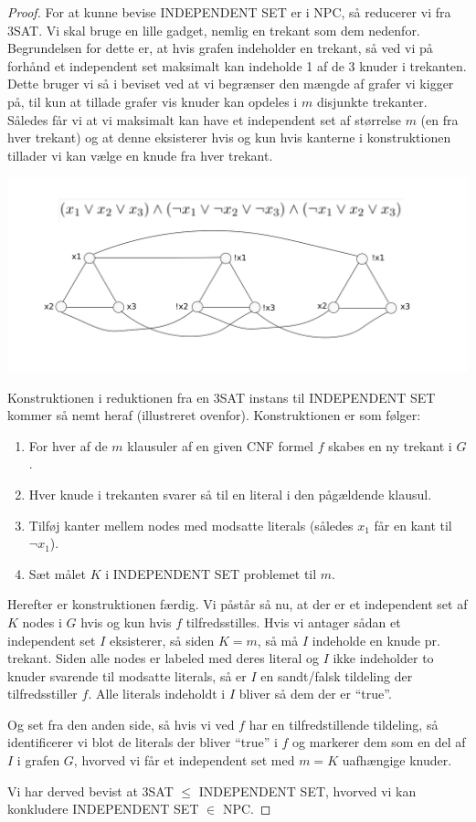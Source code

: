 \begin{proof}
 For at kunne bevise INDEPENDENT SET er i NPC, så reducerer vi fra 3SAT. Vi skal bruge en lille gadget, nemlig en trekant som dem nedenfor. Begrundelsen for dette er, at hvis grafen indeholder en trekant, så ved vi på forhånd et independent set maksimalt kan indeholde 1 af de 3 knuder i trekanten. Dette bruger vi så i beviset ved at vi begrænser den mængde af grafer vi kigger på, til kun at tillade grafer vis knuder kan opdeles i $m$ disjunkte trekanter. Således får vi at vi maksimalt kan have et independent set af størrelse $m$ (en fra hver trekant) og at denne eksisterer hvis og kun hvis kanterne i konstruktionen tillader vi kan vælge en knude fra hver trekant.
 \begin{center}
 \includegraphics[bb=0 0 842 595,scale=0.5]{img/INDEPENDENTSET.png}
\end{center}
Konstruktionen i reduktionen fra en 3SAT instans til INDEPENDENT SET kommer så nemt heraf (illustreret ovenfor). Konstruktionen er som følger:

\begin{enumerate}
 \item For hver af de $m$ klausuler af en given CNF formel $f$ skabes en ny trekant i $G$.
 \item Hver knude i trekanten svarer så til en literal i den pågældende klausul.
 \item Tilføj kanter mellem nodes med modsatte literals (således $x_1$ får en kant til $\neg x_1$).
 \item Sæt målet $K$ i INDEPENDENT SET problemet til $m$.
\end{enumerate}

Herefter er konstruktionen færdig. Vi påstår så nu, at der er et independent set af $K$ nodes i $G$ hvis og kun hvis $f$ tilfredsstilles. Hvis vi antager sådan et independent set $I$ eksisterer, så siden $K=m$, så må $I$ indeholde en knude pr. trekant. Siden alle nodes er labeled med deres literal og $I$ ikke indeholder to knuder svarende til modsatte literals, så er $I$ en sandt/falsk tildeling der tilfredsstiller $f$. Alle literals indeholdt i $I$ bliver så dem der er ``true''.

Og set fra den anden side, så hvis vi ved $f$ har en tilfredstillende tildeling, så identificerer vi blot de literals der bliver ``true'' i $f$ og markerer dem som en del af $I$ i grafen $G$, hvorved vi får et independent set med $m=K$ uafhængige knuder.

Vi har derved bevist at 3SAT $\leq$ INDEPENDENT SET, hvorved vi kan konkludere INDEPENDENT SET $\in$ NPC.
\end{proof}
